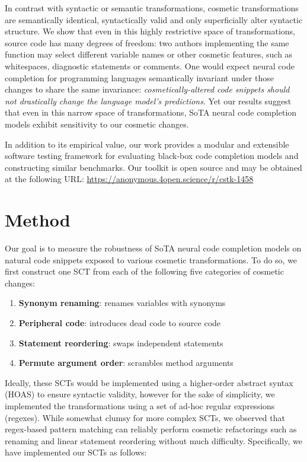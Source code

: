 \documentclass{article} %
\begin{document}
In contrast with syntactic or semantic transformations, cosmetic transformations are semantically identical, syntactically valid and only superficially alter syntactic structure. We show that even in this highly restrictive space of transformations, source code has many degrees of freedom: two authors implementing the same function may select different variable names or other cosmetic features, such as whitespaces, diagnostic statements or comments. One would expect neural code completion for programming languages semantically invariant under those changes to share the same invariance: \textit{cosmetically-altered code snippets should not drastically change the language model's predictions}. Yet our results suggest that even in this narrow space of transformations, SoTA neural code completion models exhibit sensitivity to our cosmetic changes.

In addition to its empirical value, our work provides a modular and extensible software testing framework for evaluating black-box code completion models and constructing similar benchmarks. Our toolkit is open source and may be obtained at the following URL: \url{https://anonymous.4open.science/r/cstk-1458}

\section{Method}

Our goal is to measure the robustness of SoTA neural code completion models on natural code snippets exposed to various cosmetic transformations. To do so, we first construct one SCT from each of the following five categories of cosmetic changes:

\begin{enumerate}[itemsep=1ex]
  \item \textbf{Synonym renaming}: renames variables with synonyms
  \item \textbf{Peripheral code}: introduces dead code to source code
  \item \textbf{Statement reordering}: swaps independent statements
  \item \textbf{Permute argument order}: scrambles method arguments
\end{enumerate}

Ideally, these SCTs would be implemented using a higher-order abstract syntax (HOAS) to ensure syntactic validity, however for the sake of simplicity, we implemented the transformations using a set of ad-hoc regular expressions (regexes). While somewhat clumsy for more complex SCTs, we observed that regex-based pattern matching can reliably perform cosmetic refactorings such as renaming and linear statement reordering without much difficulty. Specifically, we have implemented our SCTs as follows:
\end{document}
